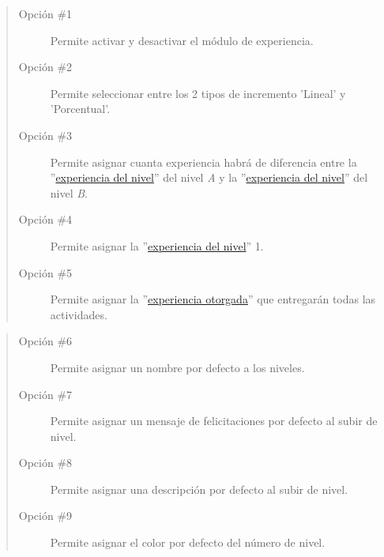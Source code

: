 

    \begin{quote}
    \begin{description}
    	\item[Opción \#1] Permite activar y desactivar el módulo de experiencia.
    	\item[Opción \#2] Permite seleccionar entre los 2 tipos de incremento 'Lineal' y 'Porcentual'.
    	\item[Opción \#3] Permite asignar cuanta experiencia habrá de diferencia entre la ''\hyperref[table:METerminosExperiencia1]{experiencia del nivel}'' del nivel \textit{A} y la ''\hyperref[table:METerminosExperiencia1]{experiencia del nivel}'' del nivel \textit{B}.
    	\item[Opción \#4] Permite asignar la ''\hyperref[table:METerminosExperiencia1]{experiencia del nivel}'' 1.
    	\item[Opción \#5] Permite asignar la ''\hyperref[table:METerminosExperiencia1]{experiencia otorgada}'' que entregarán todas las actividades.
    \end{description}
    \end{quote}

\clearpage


    \begin{quote}
    \begin{description}
    	\item[Opción \#6] Permite asignar un nombre por defecto a los niveles.
    	\item[Opción \#7] Permite asignar un mensaje de felicitaciones por defecto al subir de nivel.
    	\item[Opción \#8] Permite asignar una descripción por defecto al subir de nivel.
    	\item[Opción \#9] Permite asignar el color por defecto del número de nivel.
    \end{description}
    \end{quote}


\clearpage


